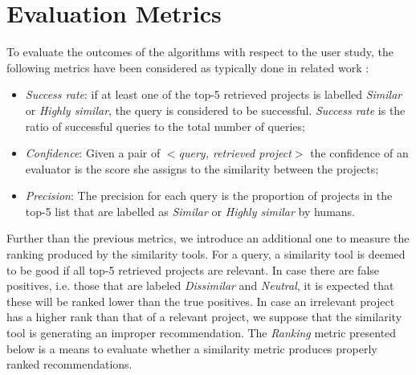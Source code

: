 

\section{Evaluation Metrics} \label{sec:Metrics}

To evaluate the outcomes of the algorithms with respect to the user study, the following metrics have been considered as typically done in related work \cite{Lo:2012:DSA:2473496.2473616,McMillan:2012:DSS:2337223.2337267,10.1109/SANER.2017.7884605}:

\begin{itemize}
	\item \textit{Success rate}: if at least one of the top-5 retrieved projects is labelled \emph{Similar} or \emph{Highly similar}, the query is considered to be successful. {\em Success rate} is the ratio of successful queries to the total number of queries;
	\item \textit{Confidence}: Given a pair of $<$\textit{query, retrieved project}$>$ the confidence of an evaluator is the score she assigns to the similarity between the projects;
	\item \textit{Precision}: The precision for each query is the proportion of projects in the top-5 list that are labelled as \emph{Similar} or \emph{Highly similar} by humans. 
\end{itemize}

Further than the previous metrics, we introduce an additional one to measure the ranking produced by the similarity tools. For a query, a similarity tool is deemed to be good if all top-5 retrieved projects are relevant. In case there are false positives, i.e. those that are labeled \emph{Dissimilar} and \emph{Neutral}, it is expected that these will be ranked lower than the true positives. In case an irrelevant project has a higher rank than that of a relevant project, we suppose that the similarity tool is generating an improper recommendation. The \emph{Ranking} metric presented below is a means to evaluate whether a similarity metric produces properly ranked recommendations. 

